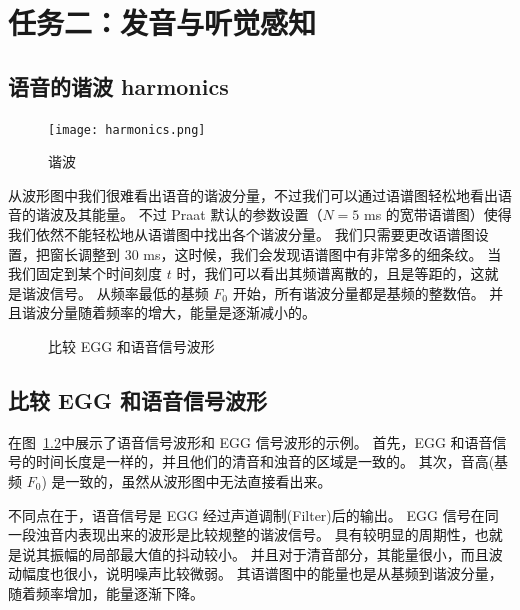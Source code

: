 \chapter{任务二：发音与听觉感知}
\label{chap:task2}

\section{语音的谐波 harmonics}

\begin{figure}[!htp]
  \centering
  \texttt{[image: harmonics.png]}
  \caption{谐波}
  \label{fig:harmonics}
\end{figure}

从波形图中我们很难看出语音的谐波分量，不过我们可以通过语谱图轻松地看出语音的谐波及其能量。
不过 Praat 默认的参数设置（$N = 5$ ms 的宽带语谱图）使得我们依然不能轻松地从语谱图中找出各个谐波分量。
我们只需要更改语谱图设置，把窗长调整到 $30$ ms，这时候，我们会发现语谱图中有非常多的细条纹。
当我们固定到某个时间刻度 $t$ 时，我们可以看出其频谱离散的，且是等距的，这就是谐波信号。
从频率最低的基频 $F_0$ 开始，所有谐波分量都是基频的整数倍。
并且谐波分量随着频率的增大，能量是逐渐减小的。

\begin{figure}[htp]
  \begin{center}

  \end{center}
    \caption{比较 EGG 和语音信号波形}
    \label{fig:waveforms_speech_EGG}
\end{figure}

\section{比较 EGG 和语音信号波形}
在图~\ref{fig:waveforms_speech_EGG}中展示了语音信号波形和 EGG 信号波形的示例。
首先，EGG 和语音信号的时间长度是一样的，并且他们的清音和浊音的区域是一致的。
其次，音高(基频 $F_0$) 是一致的，虽然从波形图中无法直接看出来。

不同点在于，语音信号是 EGG 经过声道调制(Filter)后的输出。
EGG 信号在同一段浊音内表现出来的波形是比较规整的谐波信号。
具有较明显的周期性，也就是说其振幅的局部最大值的抖动较小。
并且对于清音部分，其能量很小，而且波动幅度也很小，说明噪声比较微弱。
其语谱图中的能量也是从基频到谐波分量，随着频率增加，能量逐渐下降。

